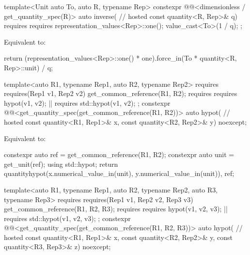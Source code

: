 \begin{itemdecl}
template<Unit auto To, auto R, typename Rep>
constexpr @@<dimensionless / get_quantity_spec(R)> auto inverse(                // hosted
  const quantity<R, Rep>& q)
  requires requires {
    representation_values<Rep>::one();
    value_cast<To>(1 / q);
  };
\end{itemdecl}

\begin{itemdescr}
\pnum
\effects
Equivalent to:
\begin{codeblock}
return (representation_values<Rep>::one() * one).force_in(To * quantity<R, Rep>::unit) / q;
\end{codeblock}
\end{itemdescr}

\begin{itemdecl}
template<auto R1, typename Rep1, auto R2, typename Rep2>
  requires requires(Rep1 v1, Rep2 v2) {
    get_common_reference(R1, R2);
    requires requires { hypot(v1, v2); } || requires { std::hypot(v1, v2); };
  }
constexpr @@<get_quantity_spec(get_common_reference(R1, R2))> auto hypot(       // hosted
  const quantity<R1, Rep1>& x, const quantity<R2, Rep2>& y) noexcept;
\end{itemdecl}

\begin{itemdescr}
\pnum
\effects
Equivalent to:
\begin{codeblock}
constexpr auto ref = get_common_reference(R1, R2);
constexpr auto unit = get_unit(ref);
using std::hypot;
return quantity{hypot(x.numerical_value_in(unit), y.numerical_value_in(unit)), ref};
\end{codeblock}
\end{itemdescr}

\begin{itemdecl}
template<auto R1, typename Rep1, auto R2, typename Rep2, auto R3, typename Rep3>
  requires requires(Rep1 v1, Rep2 v2, Rep3 v3) {
    get_common_reference(R1, R2, R3);
    requires requires { hypot(v1, v2, v3); } || requires { std::hypot(v1, v2, v3); };
  }
constexpr @@<get_quantity_spec(get_common_reference(R1, R2, R3))> auto hypot(   // hosted
  const quantity<R1, Rep1>& x, const quantity<R2, Rep2>& y,
  const quantity<R3, Rep3>& z) noexcept;
\end{itemdecl}

